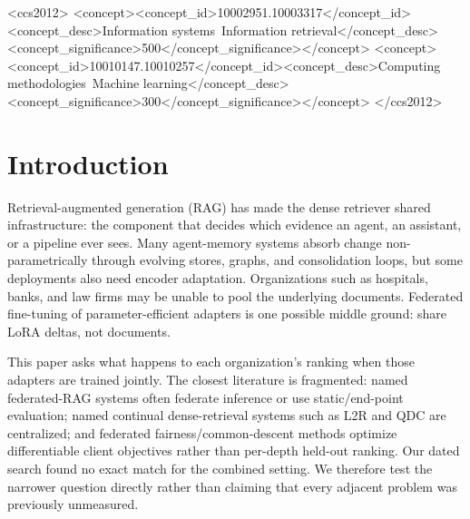 \documentclass[sigconf,anonymous,review]{acmart}
\begin{document}
\begin{abstract}
validate, the submitted frozen-A, norm-consistent FedSpan method; corrected implementation, attribution reruns, external baselines, and multi-session evidence are required before the method claim is submission-ready.
\end{abstract}

\begin{CCSXML}
<ccs2012>
<concept><concept_id>10002951.10003317</concept_id><concept_desc>Information systems~Information retrieval</concept_desc><concept_significance>500</concept_significance></concept>
<concept><concept_id>10010147.10010257</concept_id><concept_desc>Computing methodologies~Machine learning</concept_desc><concept_significance>300</concept_significance></concept>
</ccs2012>
\end{CCSXML}

\maketitle

\section{Introduction}
Retrieval-augmented generation (RAG) has made the dense retriever shared infrastructure: the component that decides which evidence an agent, an assistant, or a pipeline ever sees. Many agent-memory systems absorb change non-parametrically through evolving stores, graphs, and consolidation loops, but some deployments also need encoder adaptation. Organizations such as hospitals, banks, and law firms may be unable to pool the underlying documents. Federated fine-tuning of parameter-efficient adapters is one possible middle ground: share LoRA deltas, not documents.

This paper asks what happens to each organization's ranking when those adapters are trained jointly. The closest literature is fragmented: named federated-RAG systems often federate inference or use static/end-point evaluation; named continual dense-retrieval systems such as L2R and QDC are centralized; and federated fairness/common-descent methods optimize differentiable client objectives rather than per-depth held-out ranking. Our dated search found no exact match for the combined setting. We therefore test the narrower question directly rather than claiming that every adjacent problem was previously unmeasured.
\end{document}
